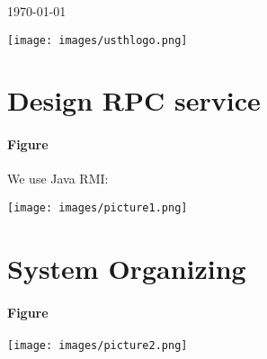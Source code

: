 \documentclass[12pt]{article}
\begin{document}
\begin{titlepage}
		
		
		
		
		{\large \today}\\[1cm] %
		
		\begin{center}
			\texttt{[image: images/usthlogo.png]}\\[1cm]
		\end{center}
		
		
		\vfill %
		
	\end{titlepage}
	
	\tableofcontents
	\newpage
	
	\section{Design RPC service}
	\paragraph{Figure}
		We use Java RMI:
	\begin{center}
		\texttt{[image: images/picture1.png]}\\[1cm]
	\end{center}
	
	
	\section{System Organizing}
	\paragraph{Figure}
	\begin{center}
		\texttt{[image: images/picture2.png]}\\[1cm]
	\end{center}
	
\end{document}
